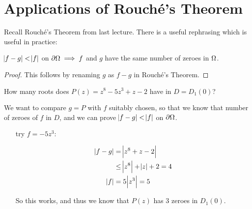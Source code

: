\setcounter{section}{0}
\setcounter{theorem}{0}


\section{Applications of Rouché's Theorem}


Recall Rouché's Theorem from last lecture. There is a useful rephrasing which is useful in practice:

\begin{corollary}
$\abs{f-g} < \abs{f}$ on $\partial \Omega \implies f$ and $g$ have the same number of zeroes in $\Omega$. 
\end{corollary}

\begin{proof}

This follows by renaming $g$ as $f-g$ in Rouché's Theorem.

\end{proof}

\begin{example}
How many roots does $P(z) = z^8-5z^3+z-2$ have in $D=D_1(0)$?

We want to compare $g=P$ with $f$ suitably chosen, so that we know that number of zeroes of $f$ in $D$, and we can prove $\abs{f-g} < \abs{f}$ on $\partial \Omega$.


\begin{enumerate}
    \item[try] $f=-5z^3$:
    
    \begin{align*}
        \abs{f-g} &= \abs{z^8+z-2}\\
        &\leq \abs{z^8} + \abs{z} +2 = 4\\
        \abs{f} &= 5\abs{z^3} = 5
    \end{align*}
    
    So this works, and thus we know that $P(z)$ has $3$ zeroes in $D_1(0)$.
    
\end{enumerate}


\end{example}



